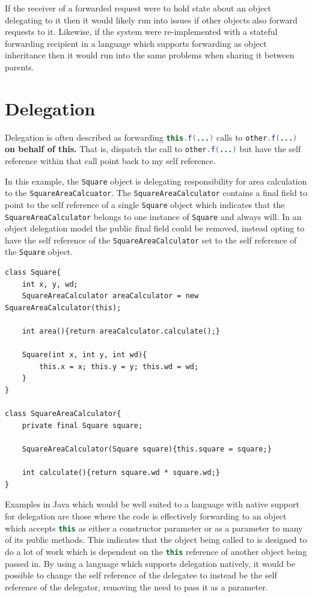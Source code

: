 \documentclass[11pt
              , a4paper
              , twoside
              , openright
              ]{report}
\newcommand{\java}[1]{\lstinline[language=Java]{#1}}
\providecommand{\DIFadd}[1]{{\protect\color{blue}\uwave{#1}}} %
\providecommand{\DIFaddbegin}{} %
\providecommand{\DIFaddend}{} %
\begin{document}
If the receiver of a forwarded request were to hold state about an object delegating to it then it would likely run into issues if other objects also forward requests to it. Likewise, if the system were re-implemented with a stateful forwarding recipient in a language which supports forwarding as object inheritance then it would run into the same problems when sharing it between parents.

\section{Delegation}
\DIFaddbegin \label{sec:delegation}
\DIFaddend Delegation is often described as forwarding \java{this.f(...)} calls to \java{other.f(...)} \textbf{on behalf of this.} That is, dispatch the call to \java{other.f(...)} but have the self reference within that call point back to my self reference. \DIFaddbegin \DIFadd{This is explained in further detail in Section \ref{inheritanceModels}.
}\DIFaddend \newline

In this example, the \java{Square} object is delegating responsibility for area calculation to the \java{SquareAreaCalcuator}. The \java{SquareAreaCalculator} contains a final field to point to the self reference of a single \java{Square} object which indicates that the \java{SquareAreaCalculator} belongs to one instance of \java{Square} and always will. In an object delegation model the public final field could be removed, instead opting to have the self reference of the \java{SquareAreaCalculator} set to the self reference of the \java{Square} object.
\begin{lstlisting}
class Square{
	int x, y, wd;
	SquareAreaCalculator areaCalculator = new SquareAreaCalculator(this);

	int area(){return areaCalculator.calculate();}

	Square(int x, int y, int wd){
		this.x = x; this.y = y; this.wd = wd;
	}
}

class SquareAreaCalculator{
	private final Square square;

	SquareAreaCalculator(Square square){this.square = square;}

	int calculate(){return square.wd * square.wd;}
}
\end{lstlisting}

Examples in Java which would be well suited to a language with native support for delegation are those where the code is effectively forwarding to an object which accepts \java{this} as either a constructor parameter or as a parameter to many of its public methods. This indicates that the object being called to is designed to do a lot of work which is dependent on the \java{this} reference of another object being passed in. By using a language which supports delegation natively, it would be possible to change the self reference of the delegatee to instead be the self reference of the delegator, removing the need to pass it as a parameter.
\end{document}
